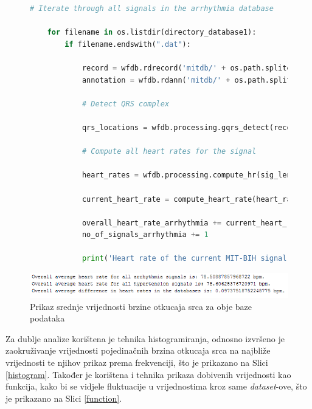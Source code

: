\documentclass[12pt,a4paper]{article}
\begin{document}
\begin{figure}[H]
\label{compute-heart-rate}
\begin{lstlisting}[language=python]
 # Iterate through all signals in the arrhythmia database

    for filename in os.listdir(directory_database1):
        if filename.endswith(".dat"):

            record = wfdb.rdrecord('mitdb/' + os.path.splitext(filename)[0], sampfrom=100000, sampto=104000)
            annotation = wfdb.rdann('mitdb/' + os.path.splitext(filename)[0], 'atr', sampfrom=100000, sampto=104000)

            # Detect QRS complex

            qrs_locations = wfdb.processing.gqrs_detect(record.p_signal[:, 0], fs=record.fs)

            # Compute all heart rates for the signal

            heart_rates = wfdb.processing.compute_hr(sig_len=record.sig_len, qrs_inds=qrs_locations, fs=record.fs)

            current_heart_rate = compute_heart_rate(heart_rates)

            overall_heart_rate_arrhythmia += current_heart_rate
            no_of_signals_arrhythmia += 1

            print('Heart rate of the current MIT-BIH signal is: ' + str(current_heart_rate) + ' bpm.')
\end{lstlisting}
\end{figure}

\begin{figure}[H]
\center
\includegraphics[scale=0.75]{../res/heart-rate-analysis.PNG}
\caption{Prikaz srednje vrijednosti brzine otkucaja srca za obje baze podataka}
\label{heart-rate}
\end{figure}

Za dublje analize korištena je tehnika histogramiranja, odnosno izvršeno je zaokruživanje vrijednosti pojedinačnih brzina otkucaja srca na najbliže vrijednosti te njihov prikaz prema frekvenciji, što je prikazano na Slici \ref{histogram}. Također je korištena i tehnika prikaza dobivenih vrijednosti kao funkcija, kako bi se vidjele fluktuacije u vrijednostima kroz same \textit{dataset}-ove, što je prikazano na Slici \ref{function}. \\
\end{document}
